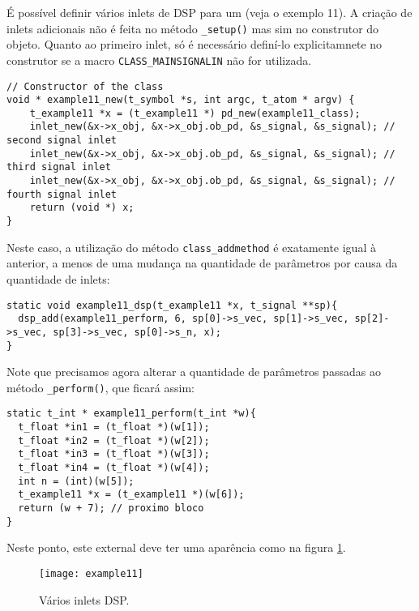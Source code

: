 É possível definir vários inlets de DSP para um \external (veja o exemplo 11).
A criação de inlets adicionais não é feita no método \texttt{\_setup()} mas
sim no construtor do objeto.
Quanto ao primeiro inlet, só é necessário definí-lo explicitamnete no construtor
se a macro \texttt{CLASS\_MAINSIGNALIN} não for utilizada.

\begin{lstlisting}[caption=Criação de vários inlets DSP]
// Constructor of the class
void * example11_new(t_symbol *s, int argc, t_atom * argv) {
    t_example11 *x = (t_example11 *) pd_new(example11_class);
    inlet_new(&x->x_obj, &x->x_obj.ob_pd, &s_signal, &s_signal); // second signal inlet
    inlet_new(&x->x_obj, &x->x_obj.ob_pd, &s_signal, &s_signal); // third signal inlet
    inlet_new(&x->x_obj, &x->x_obj.ob_pd, &s_signal, &s_signal); // fourth signal inlet
    return (void *) x;
}
\end{lstlisting}

Neste caso, a utilização do método \texttt{class\_addmethod} é exatamente
igual à anterior, a menos de uma mudança na quantidade de parâmetros por causa
da quantidade de inlets:

\begin{lstlisting}[caption=Definição do método DSP]
static void example11_dsp(t_example11 *x, t_signal **sp){
  dsp_add(example11_perform, 6, sp[0]->s_vec, sp[1]->s_vec, sp[2]->s_vec, sp[3]->s_vec, sp[0]->s_n, x);
}
\end{lstlisting}

Note que precisamos agora alterar a quantidade de parâmetros passadas ao método
\texttt{\_perform()}, que ficará assim:

\begin{lstlisting}[caption=Definição da função perform]
static t_int * example11_perform(t_int *w){
  t_float *in1 = (t_float *)(w[1]);
  t_float *in2 = (t_float *)(w[2]);
  t_float *in3 = (t_float *)(w[3]);
  t_float *in4 = (t_float *)(w[4]);
  int n = (int)(w[5]);
  t_example11 *x = (t_example11 *)(w[6]);
  return (w + 7); // proximo bloco
}
\end{lstlisting}

Neste ponto, este external deve ter uma aparência como na figura
\ref{fig:inlets-dsp}.

\begin{figure}[h!]
\centering
\texttt{[image: example11]}
\caption{Vários inlets DSP.}
\label{fig:inlets-dsp}
\end{figure}

